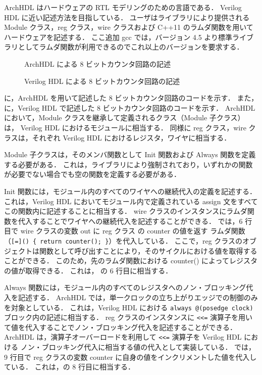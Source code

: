 ArchHDL はハードウェアの RTL モデリングのための言語である．
Verilog HDL に近い記述方法を目指している．
ユーザはライブラリにより提供される Module クラス，reg クラス，wire クラスおよび C++11 のラムダ関数を用いて
ハードウェアを記述する．
 ここ追加 \fi
gcc では，バージョン 4.5 より標準ライブラリとしてラムダ関数が利用できるのでこれ以上のバージョンを要求する．

\begin{figure}[t]
 
 \caption{ArchHDL による 8 ビットカウンタ回路の記述}
 \label{src:counter}
\end{figure}

\begin{figure}[t]
 
 \caption{Verilog HDL による 8 ビットカウンタ回路の記述}
 \label{src:counter_v}
\end{figure}

に，ArchHDL を用いて記述した 8 ビットカウンタ回路のコードを示す．
また， に，Verilog HDL で記述した 8 ビットカウンタ回路のコードを示す．
ArchHDL において，Module クラスを継承して定義されるクラス（Module 子クラス）は，
Verilog HDL におけるモジュールに相当する．
同様に reg クラス，wire クラスは，それぞれ Verilog HDL におけるレジスタ，ワイヤに相当する．

Module 子クラスは，そのメンバ関数として Init 関数および Always 関数を定義する必要がある．
これは，ライブラリにより強制されており，いずれかの関数が必要でない場合でも空の関数を定義する必要がある．

Init 関数には，モジュール内のすべてのワイヤへの継続代入の定義を記述する．
これは，Verilog HDL においてモジュール内で定義されている assign 文をすべてこの関数内に記述することに相当する．
wire クラスのインスタンスにラムダ関数を代入することでワイヤへの継続代入を記述することができる．
では，6 行目で wire クラスの変数 out に reg クラス の counter の値を返す
ラムダ関数（\verb/[=]() { return counter(); }/）を代入している．
ここで，reg クラスのオブジェクトは関数として呼び出すことにより，そのサイクルにおける値を取得することができる．
このため，先のラムダ関数における counter() によってレジスタの値が取得できる．
これは， の 6 行目に相当する．

Always 関数には，モジュール内のすべてのレジスタへのノン・ブロッキング代入を記述する．
ArchHDL では，単一クロックの立ち上がりエッジでの制御のみを対象としている．
これは，Verilog HDL における \verb/always @(posedge clock)/ ブロック内の記述に相当する．
reg クラスのインスタンスに \verb/<<=/ 演算子を用いて値を代入することでノン・ブロッキング代入を記述することができる．
ArchHDL は，演算子オーバーロードを利用して \verb/<<=/ 演算子を Verilog HDL における
ノン・ブロッキング代入に相当する値の代入として実装している．
では，9 行目で reg クラスの変数 counter に自身の値をインクリメントした値を代入している．
これは，の 8 行目に相当する．

